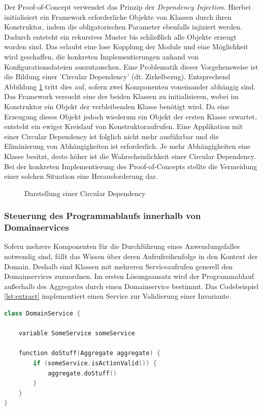 Der Proof-of-Concept verwendet das Prinzip der \emph{Dependency Injection}. Hierbei initialisiert ein Framework erforderliche Objekte von Klassen durch ihren Konstruktor, indem die obligatorischen Parameter ebenfalls injiziert werden. Dadurch entsteht ein rekursives Muster bis schließlich alle Objekte erzeugt worden sind. Das erlaubt eine lose Kopplung der Module und eine Möglichkeit wird geschaffen, die konkreten Implementierungen anhand von Konfigurationsdateien auszutauschen. Eine Problematik dieser Vorgehensweise ist die Bildung einer 'Circular Dependency' (dt. Zirkelbezug). Entsprechend Abbildung \ref{fig:circulardependency} tritt dies auf, sofern zwei Komponenten voneinander abhängig sind. Das Framework versucht eine der beiden Klassen zu initialisieren, wobei im Konstruktor ein Objekt der verbleibenden Klasse benötigt wird. Da eine Erzeugung dieses Objekt jedoch wiederum ein Objekt der ersten Klasse erwartet, entsteht ein ewiger Kreislauf von Konstruktoraufrufen. Eine Applikation mit einer Circular Dependency ist folglich nicht mehr ausführbar und die Eliminierung von Abhängigkeiten ist erforderlich. Je mehr Abhängigkeiten eine Klasse besitzt, desto höher ist die Wahrscheinlichkeit einer Circular Dependency. Bei der konkreten Implementierung des Proof-of-Concepts stellte die Vermeidung einer solchen Situation eine Herausforderung dar. \cite[S. 93ff.]{Suryanarayana.2015}

\begin{figure}[htbp]
	\vspace{0.3cm}
	\centering
	\footnotesize
	
	\caption{Darstellung einer Circular Dependency}
	\label{fig:circulardependency}
\end{figure}


\subsubsection{Steuerung des Programmablaufs innerhalb von Domainservices}

Sofern mehrere Komponenten für die Durchführung eines Anwendungsfalles notwendig sind, fällt das Wissen über deren Aufrufreihenfolge in den Kontext der Domain. Deshalb sind Klassen mit mehreren Serviceaufrufen generell den Domainservices zuzuordnen. Im ersten Lösungsansatz wird der Programmablauf außerhalb des Aggregates durch einen Domainservice bestimmt. Das Codebeispiel \ref{lst:extract} implementiert einen Service zur Validierung einer Invariante.

\vspace{0.5cm}
\begin{minipage}{\linewidth} %
	\begin{lstlisting}[caption={Bestimmung des Steuerflusses durch einen Domainservice}, label={lst:extract}, language=Kotlin]
class DomainService {
	
	variable SomeService someService
	
	function doStuff(Aggregate aggregate) {
		if (someService.isActionValid()) {     
			aggregate.doStuff()
		}
	}
}
	\end{lstlisting}
\end{minipage}

